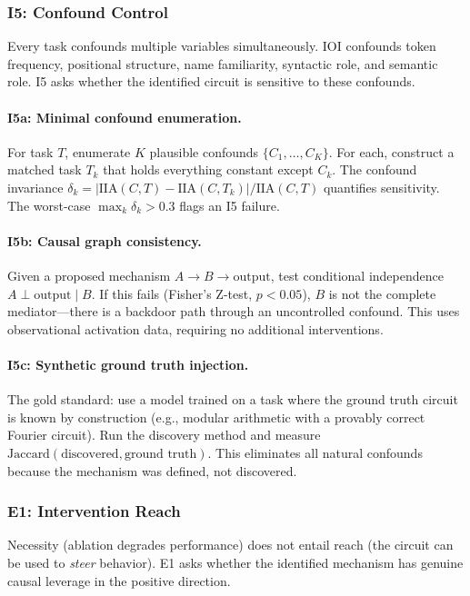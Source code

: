 \documentclass{article}
\begin{document}
\subsubsection{I5: Confound Control}

Every task confounds multiple variables simultaneously. IOI confounds token frequency, positional structure, name familiarity, syntactic role, and semantic role. I5 asks whether the identified circuit is sensitive to these confounds.

\paragraph{I5a: Minimal confound enumeration.} For task $T$, enumerate $K$ plausible confounds $\{C_1, \ldots, C_K\}$. For each, construct a matched task $T_k$ that holds everything constant except $C_k$. The confound invariance $\delta_k = |\text{IIA}(C, T) - \text{IIA}(C, T_k)| / \text{IIA}(C, T)$ quantifies sensitivity. The worst-case $\max_k \delta_k > 0.3$ flags an I5 failure.

\paragraph{I5b: Causal graph consistency.} Given a proposed mechanism $A \to B \to \text{output}$, test conditional independence $A \perp \text{output} \mid B$. If this fails (Fisher's Z-test, $p < 0.05$), $B$ is not the complete mediator---there is a backdoor path through an uncontrolled confound. This uses observational activation data, requiring no additional interventions.

\paragraph{I5c: Synthetic ground truth injection.} The gold standard: use a model trained on a task where the ground truth circuit is known by construction (e.g., modular arithmetic with a provably correct Fourier circuit). Run the discovery method and measure $\text{Jaccard}(\text{discovered}, \text{ground truth})$. This eliminates all natural confounds because the mechanism was defined, not discovered.

\subsubsection{E1: Intervention Reach}

Necessity (ablation degrades performance) does not entail reach (the circuit can be used to \emph{steer} behavior). E1 asks whether the identified mechanism has genuine causal leverage in the positive direction.
\end{document}
